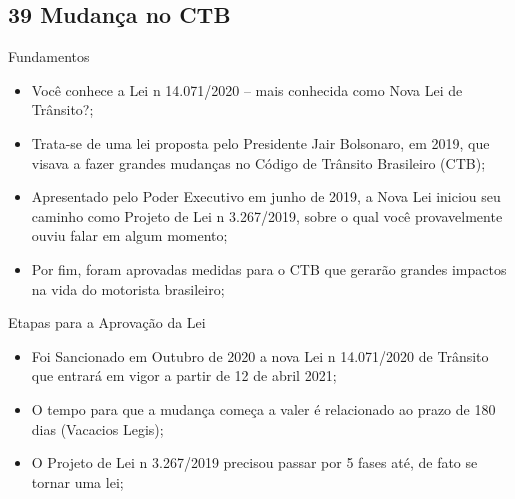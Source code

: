 \documentclass{beamer}
\begin{document}
\subsection{39 Mudança no CTB}
\begin{frame}{Fundamentos}
    \begin{itemize}
        \item \justifying Você conhece a Lei n 14.071/2020 – mais conhecida como Nova Lei de Trânsito?;
        \item \justifying Trata-se de uma lei proposta pelo Presidente Jair Bolsonaro, em 2019, que visava a fazer grandes mudanças no Código de Trânsito Brasileiro (CTB);
        \item \justifying Apresentado pelo Poder Executivo em junho de 2019, a Nova Lei iniciou seu caminho como Projeto de Lei n 3.267/2019, sobre o qual você provavelmente ouviu falar em algum momento;
        \item \justifying Por fim, foram aprovadas medidas para o CTB que gerarão grandes impactos na vida do motorista brasileiro;
    \end{itemize}
\end{frame}
\begin{frame}{Etapas para a Aprovação da Lei}
    \begin{itemize}
        \item \justifying Foi Sancionado em Outubro de 2020 a nova Lei n 14.071/2020 de Trânsito que entrará em vigor a partir de 12 de abril 2021;
        \item \justifying O tempo para que a mudança começa a valer é relacionado ao prazo de 180 dias (Vacacios Legis);
        \item \justifying O Projeto de Lei n 3.267/2019 precisou passar por 5 fases até, de fato se tornar uma lei;
    \end{itemize}
\end{frame}
\end{document}
